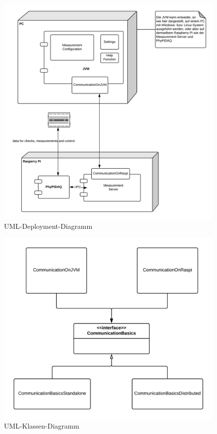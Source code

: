 \documentclass[parskip=full]{scrartcl}
\begin{document}
\begin{figure}[h]
	\begin{center}
		\includegraphics[width = 12cm]{Grafik/DeploymentDiagram.png}
		\caption{UML-Deployment-Diagramm}
		\label{DeploymentDiagram}
	\end{center}
\end{figure}

\begin{figure}[h]
	\begin{center}
		\includegraphics[width = 12cm]{Grafik/ClassDiagramForCommunication.png}
		\caption{UML-Klassen-Diagramm}
		\label{ClassDiagram}
	\end{center}
\end{figure}
\end{document}
